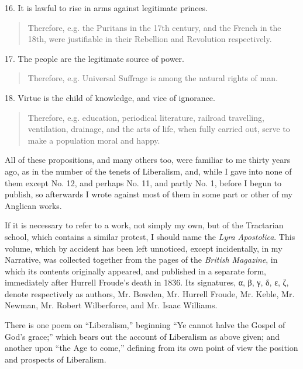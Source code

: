 16. It is lawful to rise in arms against legitimate princes.

\begin{quote}

Therefore, e.g. the Puritans in the 17th century, and the French
in the 18th, were justifiable in their Rebellion and Revolution
respectively.

\end{quote}

17. The people are the legitimate source of power.

\begin{quote}

Therefore, e.g. Universal Suffrage is among the natural rights of
man.

\end{quote}

18. Virtue is the child of knowledge, and vice of ignorance.

\begin{quote}

Therefore, e.g. education, periodical literature, railroad
travelling, ventilation, drainage, and the arts of life, when fully
carried out, serve to make a population moral and happy.

\end{quote}

All of these propositions, and many others too, were familiar to me
thirty years ago, as in the number of the tenets of Liberalism, and,
while I gave into none of them except No. 12, and perhaps No. 11, and
partly No. 1, before I begun to publish, so afterwards I wrote against
most of them in some part or other of my Anglican works.

If it is necessary to refer to a work, not simply my own, but of the
Tractarian school, which contains a similar protest, I should name the \emph{Lyra
Apostolica}. This volume, which by accident has been left unnoticed,
except incidentally, in my Narrative, was collected together from the
pages of the \emph{British Magazine}, in which its contents
originally appeared, and published in a
separate form, immediately after Hurrell Froude's death in 1836. Its
signatures, α, β, γ, δ, ε, ζ, denote
respectively as authors, Mr. Bowden, Mr. Hurrell Froude,
Mr. Keble, Mr. Newman, Mr. Robert Wilberforce, and Mr. Isaac Williams.

There is one poem on ``Liberalism,'' beginning ``Ye
cannot halve the Gospel of God's grace;'' which bears out the
account of Liberalism as above given; and another upon ``the Age to
come,'' defining from its own point of view the position and
prospects of Liberalism.

